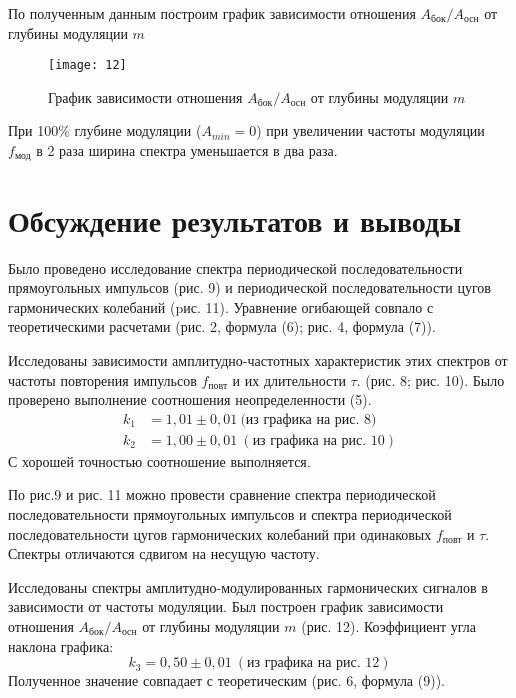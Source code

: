 По полученным данным построим график
зависимости отношения
$A_\text{бок}/A_\text{осн}$ от глубины
модуляции $m$

\begin{figure}[H]
    \texttt{[image: 12]} 
    \captionsetup{justification=centering}
    \caption{График
зависимости отношения
$A_\text{бок}/A_\text{осн}$ от глубины
модуляции $m$
}
\end{figure}

При 100\% глубине модуляции ($A_{min} =
0$) при увеличении частоты модуляции
$f_\text{мод}$ в 2 раза ширина спектра
уменьшается в два раза.

\section{Обсуждение результатов и выводы}
Было проведено исследование спектра
периодической последовательности
прямоугольных импульсов (рис. 9) и периодической
последовательности цугов гармонических
колебаний (pис. 11). Уравнение огибающей
совпало с теоретическими расчетами
(рис. 2, формула (6); рис. 4, формула
(7)).

Исследованы
зависимости амплитудно-частотных
характеристик этих спектров от частоты
повторения импульсов $f_\text{повт}$
и их длительности $\tau$. (рис. 8; рис.
10). Было проверено выполнение
соотношения неопределенности (5).
\begin{align*}
    k_1 &= 1,01 \pm 0,01 \ (\text{из
    графика на рис. 8)} \\
    k_2 &= 1,00 \pm 0,01 \ (\text{из
    графика на рис. 10})
\end{align*}
С
хорошей точностью соотношение
выполняется. 

По рис.9 и рис. 11 можно провести
сравнение спектра периодической
последовательности прямоугольных
импульсов и спектра периодической
последовательности цугов гармонических
колебаний при одинаковых $f_\text{повт}$
и $\tau$. Спектры отличаются сдвигом на
несущую частоту.

Исследованы спектры
амплитудно-модулированных гармонических
сигналов в зависимости от частоты
модуляции. Был построен график
зависимости отношения
$A_\text{бок}/A_\text{осн}$ от глубины
модуляции $m$ (рис. 12). Коэффициент
угла наклона графика:
\[
    k_3 = 0,50 \pm 0,01 \ (\text{из графика на
    рис. 12})
\]
Полученное значение совпадает с теоретическим 
(рис. 6, формула (9)).


